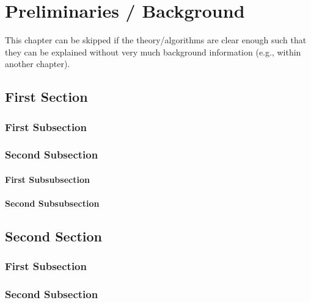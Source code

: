 
\chapter{Preliminaries / Background}
This chapter can be skipped if the theory/algorithms are clear enough
such that they can be explained without very much background
information (e.g., within another chapter).

\section{First Section}



\subsection{First Subsection}


\subsection{Second Subsection}


\subsubsection{First Subsubsection}

\subsubsection{Second Subsubsection}


\section{Second Section}


\subsection{First Subsection}


\subsection{Second Subsection}

